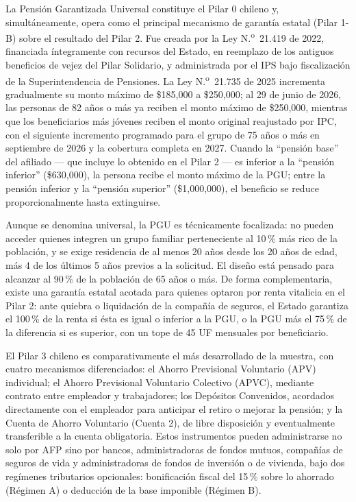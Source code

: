 \documentclass[12pt, letterpaper]{article}
\begin{document}
La Pensión Garantizada Universal constituye el Pilar 0 chileno y, simultáneamente, opera como el principal mecanismo de garantía estatal (Pilar 1-B) sobre el resultado del Pilar 2. Fue creada por la Ley N.\textsuperscript{o}~21.419 de 2022, financiada íntegramente con recursos del Estado, en reemplazo de los antiguos beneficios de vejez del Pilar Solidario, y administrada por el IPS bajo fiscalización de la Superintendencia de Pensiones. La Ley N.\textsuperscript{o}~21.735 de 2025 incrementa gradualmente su monto máximo de \$185,000 a \$250,000; al 29 de junio de 2026, las personas de 82 años o más ya reciben el monto máximo de \$250,000, mientras que los beneficiarios más jóvenes reciben el monto original reajustado por IPC, con el siguiente incremento programado para el grupo de 75 años o más en septiembre de 2026 y la cobertura completa en 2027. Cuando la ``pensión base'' del afiliado --- que incluye lo obtenido en el Pilar 2 --- es inferior a la ``pensión inferior'' (\$630,000), la persona recibe el monto máximo de la PGU; entre la pensión inferior y la ``pensión superior'' (\$1,000,000), el beneficio se reduce proporcionalmente hasta extinguirse.

Aunque se denomina universal, la PGU es técnicamente focalizada: no pueden acceder quienes integren un grupo familiar perteneciente al 10\,\% más rico de la población, y se exige residencia de al menos 20 años desde los 20 años de edad, más 4 de los últimos 5 años previos a la solicitud. El diseño está pensado para alcanzar al 90\,\% de la población de 65 años o más. De forma complementaria, existe una garantía estatal acotada para quienes optaron por renta vitalicia en el Pilar 2: ante quiebra o liquidación de la compañía de seguros, el Estado garantiza el 100\,\% de la renta si ésta es igual o inferior a la PGU, o la PGU más el 75\,\% de la diferencia si es superior, con un tope de 45 UF mensuales por beneficiario.

El Pilar 3 chileno es comparativamente el más desarrollado de la muestra, con cuatro mecanismos diferenciados: el Ahorro Previsional Voluntario (APV) individual; el Ahorro Previsional Voluntario Colectivo (APVC), mediante contrato entre empleador y trabajadores; los Depósitos Convenidos, acordados directamente con el empleador para anticipar el retiro o mejorar la pensión; y la Cuenta de Ahorro Voluntario (Cuenta 2), de libre disposición y eventualmente transferible a la cuenta obligatoria. Estos instrumentos pueden administrarse no solo por AFP sino por bancos, administradoras de fondos mutuos, compañías de seguros de vida y administradoras de fondos de inversión o de vivienda, bajo dos regímenes tributarios opcionales: bonificación fiscal del 15\,\% sobre lo ahorrado (Régimen A) o deducción de la base imponible (Régimen B).
\end{document}
